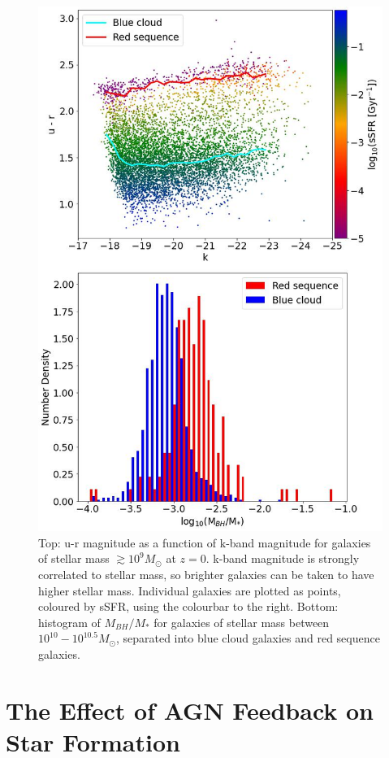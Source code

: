 \documentclass[12pt]{article}%
\begin{document}
\begin{figure}[H]
\centering
\includegraphics[width=14.5cm]{Plot_1.jpeg}
\caption{Top: u-r magnitude as a function of k-band magnitude for galaxies of stellar mass $\gtrsim10^9M_\odot$ at $z=0$. k-band magnitude is strongly correlated to stellar mass, so brighter galaxies can be taken to have higher stellar mass. Individual galaxies are plotted as points, coloured by sSFR, using the colourbar to the right. Bottom: histogram of $M_{BH}/M_*$ for galaxies of stellar mass between $10^{10} - 10^{10.5}M_\odot$, separated into blue cloud galaxies and red sequence galaxies.}
\label{fig:2}
\end{figure}
\twocolumngrid


\section{The Effect of AGN Feedb\-ack on Star Formation}
\end{document}
